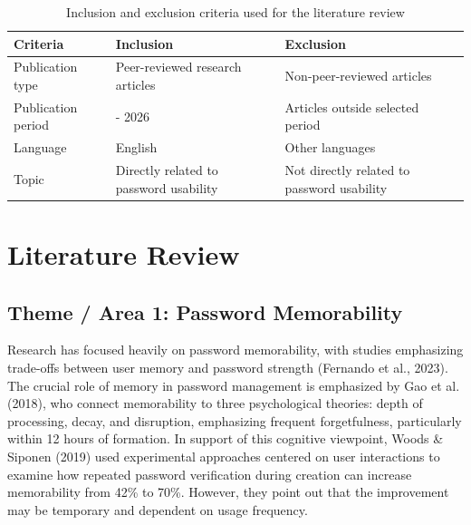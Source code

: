 \documentclass[12pt,a4paper]{article}
\begin{document}
\begin{table}[H]
\caption{Inclusion and exclusion criteria used for the literature review}
\label{tab:inclusion-exclusion}

\fontsize{10pt}{12pt}\selectfont

\begin{tabular}{|p{4cm}|p{5cm}|p{5cm}|}
\hline
\centering\textbf{Criteria} &
\centering\textbf{Inclusion} &
\centering\textbf{Exclusion}
\tabularnewline
\hline

\centering Publication type &
\centering Peer-reviewed research articles &
\centering Non-peer-reviewed articles
\tabularnewline
\hline

\centering Publication period &
\centering 2022 - 2026 &
\centering Articles outside selected period
\tabularnewline
\hline

\centering Language &
\centering English &
\centering Other languages
\tabularnewline
\hline

\centering Topic &
\centering Directly related to password usability &
\centering Not directly related to password usability
\tabularnewline
\hline

\end{tabular}

\end{table}


\section{Literature Review}

\subsection{Theme / Area 1: Password Memorability}

Research has focused heavily on password memorability, with studies emphasizing trade-offs between user memory and password strength (Fernando et al., 2023). The crucial role of memory in password management is emphasized by Gao et al. (2018), who connect memorability to three psychological theories: depth of processing, decay, and disruption, emphasizing frequent forgetfulness, particularly within 12 hours of formation. In support of this cognitive viewpoint, Woods \& Siponen (2019) used experimental approaches centered on user interactions to examine how repeated password verification during creation can increase memorability from 42\% to 70\%. However, they point out that the improvement may be temporary and dependent on usage frequency.
\end{document}
